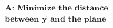 \documentclass[preview]{standalone}
\begin{document}
\begin{align*}
\textbf{A:} \,\, \textbf{Minimize} \,\, \textbf{the distance} \\ \textbf{between} \,\, \mathbf{\vec{y}} \,\, \textbf{and the} \,\, \textbf{plane}
\end{align*}
\end{document}
